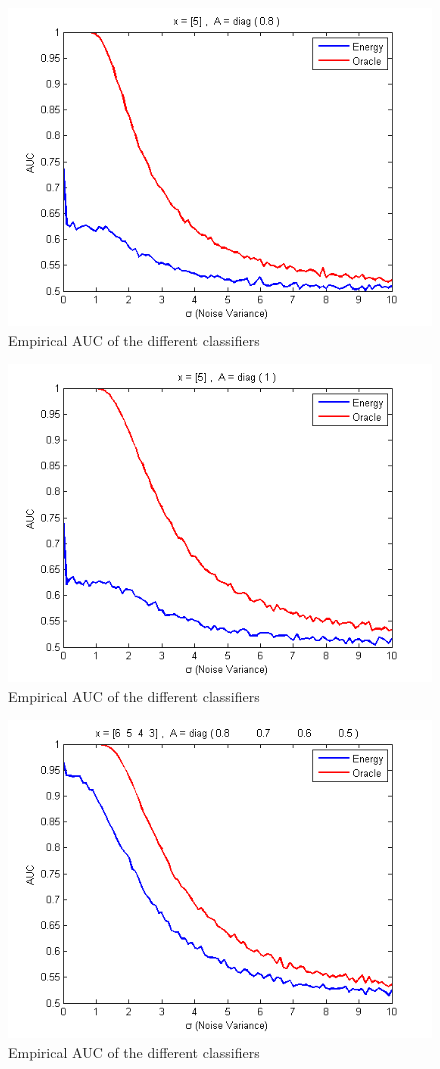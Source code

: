 \documentclass[english]{article}
\begin{document}
\begin{figure}[h!]
\centering
\includegraphics[width=5in]{auc_2.png}
\caption{Empirical AUC of the different classifiers}
\label{fig:auc_2}
\end{figure}

\begin{figure}[h!]
\centering
\includegraphics[width=5in]{auc_3.png}
\caption{Empirical AUC of the different classifiers}
\label{fig:auc_3}
\end{figure}

\begin{figure}[h!]
\centering
\includegraphics[width=5in]{auc_4.png}
\caption{Empirical AUC of the different classifiers}
\label{fig:auc_4}
\end{figure}
\end{document}
